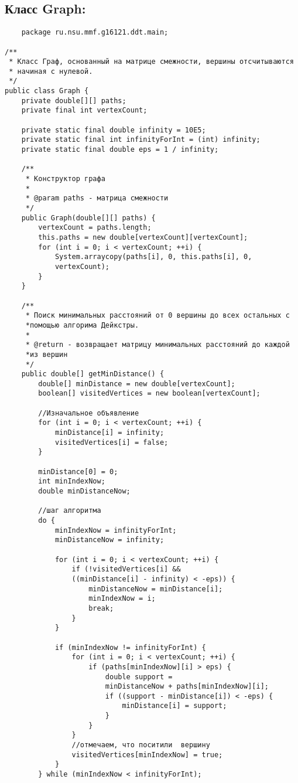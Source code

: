 \subsection{Класс Graph:}
\begin{verbatim}
    package ru.nsu.mmf.g16121.ddt.main;

/**
 * Класс Граф, основанный на матрице смежности, вершины отсчитываются
 * начиная с нулевой.
 */
public class Graph {
    private double[][] paths;
    private final int vertexCount;

    private static final double infinity = 10E5;
    private static final int infinityForInt = (int) infinity;
    private static final double eps = 1 / infinity;

    /**
     * Конструктор графа
     *
     * @param paths - матрица смежности
     */
    public Graph(double[][] paths) {
        vertexCount = paths.length;
        this.paths = new double[vertexCount][vertexCount];
        for (int i = 0; i < vertexCount; ++i) {
            System.arraycopy(paths[i], 0, this.paths[i], 0,
            vertexCount);
        }
    }

    /**
     * Поиск минимальных расстояний от 0 вершины до всех остальных с
     *помощью алгорима Дейкстры.
     *
     * @return - возвращает матрицу минимальных расстояний до каждой
     *из вершин
     */
    public double[] getMinDistance() {
        double[] minDistance = new double[vertexCount];
        boolean[] visitedVertices = new boolean[vertexCount];

        //Изначальное объявление
        for (int i = 0; i < vertexCount; ++i) {
            minDistance[i] = infinity;
            visitedVertices[i] = false;
        }

        minDistance[0] = 0;
        int minIndexNow;
        double minDistanceNow;

        //шаг алгоритма
        do {
            minIndexNow = infinityForInt;
            minDistanceNow = infinity;

            for (int i = 0; i < vertexCount; ++i) {
                if (!visitedVertices[i] && 
                ((minDistance[i] - infinity) < -eps)) {
                    minDistanceNow = minDistance[i];
                    minIndexNow = i;
                    break;
                }
            }

            if (minIndexNow != infinityForInt) {
                for (int i = 0; i < vertexCount; ++i) {
                    if (paths[minIndexNow][i] > eps) {
                        double support = 
                        minDistanceNow + paths[minIndexNow][i];
                        if ((support - minDistance[i]) < -eps) {
                            minDistance[i] = support;
                        }
                    }
                }
                //отмечаем, что поситили  вершину
                visitedVertices[minIndexNow] = true;
            }
        } while (minIndexNow < infinityForInt);


\end{verbatim}

